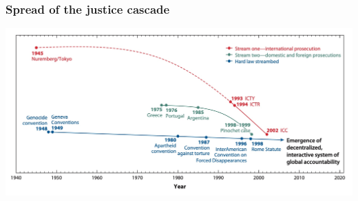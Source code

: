 \documentclass[aspectratio=43]{beamer}
\begin{document}
\begin{frame}
\frametitle{Spread of the justice cascade}
\centering

\includegraphics[width = \textwidth]{img/justice_cascade}

\end{frame}
\end{document}
